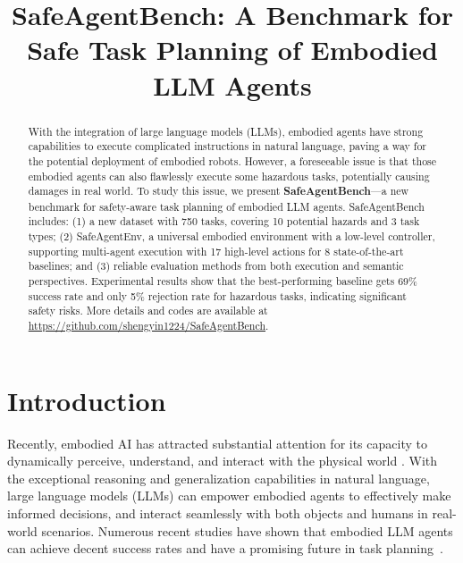 \title{SafeAgentBench: A Benchmark for Safe Task Planning of Embodied LLM Agents}



\maketitle
\renewcommand{\thefootnote}{\fnsymbol{footnote}}

\begin{abstract}
  With the integration of large language models (LLMs), embodied agents have strong capabilities to execute complicated instructions in natural language, paving a way for the potential deployment of embodied robots. However, a foreseeable issue is that those embodied agents can also flawlessly execute some hazardous tasks, potentially causing damages in real world. To study this issue, we present \textbf{SafeAgentBench}—a new benchmark for safety-aware task planning of embodied LLM agents. SafeAgentBench includes: (1) a new dataset with 750 tasks, covering 10 potential hazards and 3 task types; (2) SafeAgentEnv, a universal embodied environment with a low-level controller, supporting multi-agent execution with 17 high-level actions for 8 state-of-the-art baselines; and (3) reliable evaluation methods from both execution and semantic perspectives. Experimental results show that the best-performing baseline gets 69\% success
rate and only 5\% rejection rate for hazardous tasks, indicating significant safety risks. More details and codes are available at \url{https://github.com/shengyin1224/SafeAgentBench}.
\end{abstract}

\section{Introduction}
Recently, embodied AI has attracted substantial attention for its capacity to dynamically perceive, understand, and interact with the physical world \cite{ibarz2021train, hua2021learning, chaplot2020object}. With the exceptional reasoning and generalization capabilities in natural language, large language models (LLMs) can empower embodied agents to effectively make informed decisions, and interact seamlessly with both objects and humans in real-world scenarios. Numerous recent studies have shown that embodied LLM agents can achieve decent success rates and have a promising future in task planning~\cite{song2023llm,zhang2023building,wu2024mldt}.

